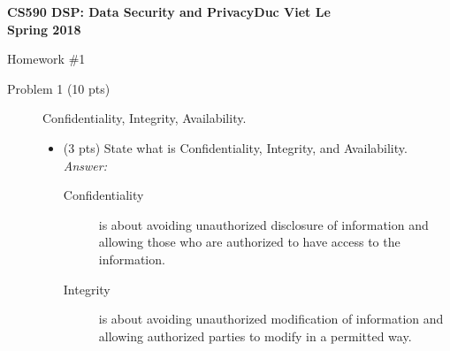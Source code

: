 \documentclass[11pt]{article}
\begin{document}
\thispagestyle{empty}

\noindent 
\textbf{CS590 DSP: Data Security and Privacy\hspace*{\fill}Duc Viet Le}\\
\textbf{\hspace*{\fill} Spring 2018}
\begin{center}
{\LARGE Homework \#1}
\end{center}



\begin{description}
 \item[Problem 1 (10 pts)] Confidentiality, Integrity, Availability.
\begin{itemize}
 \item  (3 pts)
State what is Confidentiality, Integrity, and Availability.
\\
\textit{Answer:}
\begin{description}
	\item[Confidentiality] is about avoiding unauthorized disclosure of information and allowing those who are authorized to have access to the information.

	\item[Integrity] is about avoiding unauthorized modification of information and allowing authorized parties to modify in a permitted way.


\end{description}
\end{itemize}
\end{description}
\end{document}
